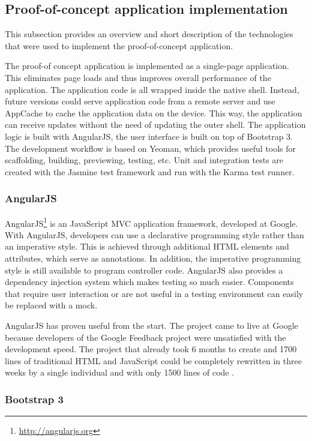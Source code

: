 \subsection{Proof-of-concept application implementation}

This subsection provides an overview and short description of the technologies that were used to implement the proof-of-concept application. 

The proof-of concept application is implemented as a single-page application. This eliminates page loads and thus improves overall performance of the application. The application code is all wrapped inside the native shell. Instead, future versions could serve application code from a remote server and use AppCache to cache the application data on the device. This way, the application can receive updates without the need of updating the outer shell. The application logic is built with AngularJS, the user interface is built on top of Bootstrap 3. The development workflow is based on Yeoman, which provides useful tools for scaffolding, building, previewing, testing, etc. Unit and integration tests are created with the Jasmine test framework and run with the Karma test runner.

\subsubsection{AngularJS}

AngularJS\footnote{\url{http://angularjs.org}} is an JavaScript MVC application framework, developed at Google. With AngularJS, developers can use a declarative programming style rather than an imperative style. This is achieved through additional HTML elements and attributes, which serve as annotations. In addition, the imperative programming style is still available to program controller code. AngularJS also provides a dependency injection system which makes testing so much easier. Components that require user interaction or are not useful in a testing environment can easily be replaced with a mock.

AngularJS has proven useful from the start. The project came to live at Google because developers of the Google Feedback project were unsatisfied with the development speed. The project that already took 6 months to create and 1700 lines of traditional HTML and JavaScript could be completely rewritten in three weeks by a single individual and with only 1500 lines of code \cite{Green:2013}.

\subsubsection{Bootstrap 3}

